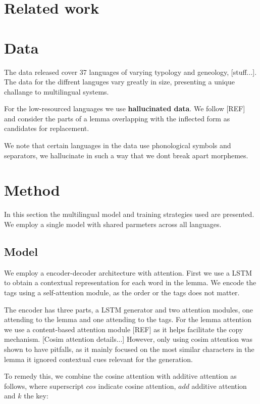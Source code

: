\documentclass[11pt,a4paper]{article}
\begin{document}
\section{Related work}

\section{Data}

The data released cover 37 languages of varying typology and
geneology, [stuff...]. The data for the diffrent languges vary greatly
in size, presenting a unique challange to multilingual systems.

For the low-resourced languages we use \textbf{hallucinated data}. We
follow [REF] and consider the parts of a lemma overlapping with the
inflected form as candidates for replacement.

We note that certain languages in the data use phonological symbols
and separators, we hallucinate in such a way that we dont break apart
morphemes.


\section{Method}

In this section the multilingual model and training strategies used
are presented. We employ a single model with shared parmeters
across all languages. 

\subsection{Model}

We employ a encoder-decoder architecture with attention. First we use
a LSTM to obtain a contextual representation for each word in the
lemma. We encode the tags using a self-attention module, as the order
or the tags does not matter.

The encoder has three parts, a LSTM generator and two attention
modules, one attending to the lemma and one attending to the tags. For
the lemma attention we use a content-based attention module [REF] as
it helps facilitate the copy mechanism. [Cosim attention details...]
However, only using cosim attention was shown to have pitfalls, as it
mainly focused on the most similar characters in the lemma it ignored
contextual cues relevant for the generation.

To remedy this, we combine the cosine attention with additive
attention as follows, where superscript $cos$ indicate cosine attention,
$add$ additive attention and $k$ the key:
\end{document}
